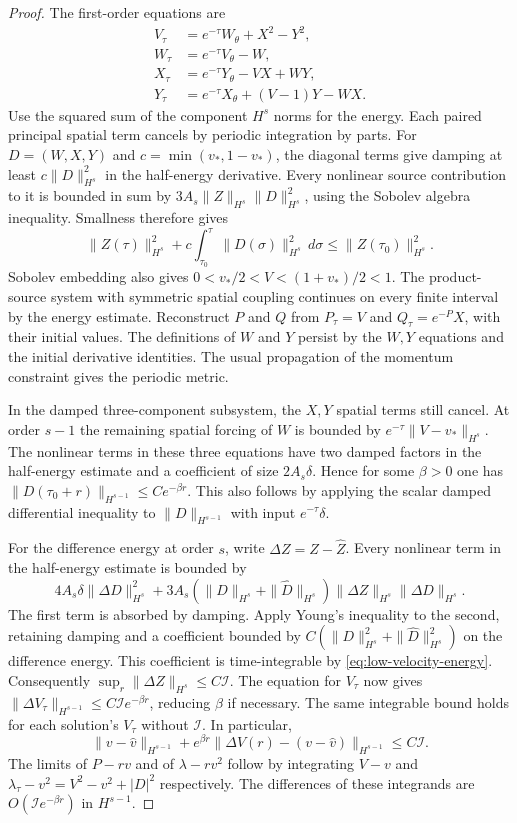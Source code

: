 \begin{proof}
The first-order equations are
\begin{align*}
 V_\tau &= e^{-\tau}W_\theta+X^2-Y^2,\\
 W_\tau &= e^{-\tau}V_\theta-W,\\
 X_\tau &= e^{-\tau}Y_\theta-V X+W Y,\\
 Y_\tau &= e^{-\tau}X_\theta+(V-1)Y-W X .
\end{align*}
Use the squared sum of the component $H^s$ norms
for the energy. Each paired principal spatial
term cancels by periodic integration by parts.
For $D=(W,X,Y)$ and $c=\min(v_*,1-v_*)$,
the diagonal terms give damping at least
$c\|D\|_{H^s}^2$ in the half-energy derivative.
Every nonlinear source contribution to it is
bounded in sum by
$3A_s\|Z\|_{H^s}\|D\|_{H^s}^2$, using the Sobolev
algebra inequality. Smallness therefore gives
\begin{equation}
 \|Z(\tau)\|_{H^s}^2+
             c\int_{\tau_0}^{\tau}\|D(\sigma)\|_{H^s}^2\,d\sigma
     \le \|Z(\tau_0)\|_{H^s}^2.
 \label{eq:low-velocity-energy}
\end{equation}
Sobolev embedding also gives
$0<v_*/2<V< (1+v_*)/2<1$.
The product-source system with symmetric
spatial coupling continues on every finite interval
by the energy estimate. Reconstruct $P$ and $Q$
from $P_\tau=V$ and $Q_\tau=e^{-P}X$,
with their initial values. The definitions of $W$
and $Y$ persist by the $W,Y$ equations and the initial
derivative identities. The usual
propagation of the momentum constraint gives
the periodic metric.

In the damped three-component subsystem,
the $X,Y$ spatial terms still cancel.
At order $s-1$ the remaining spatial forcing
of $W$ is bounded by $e^{-\tau}\|V-v_*\|_{H^s}$.
The nonlinear terms in these three equations
have two damped factors in the half-energy
estimate and a coefficient of size $2A_s\delta$.
Hence for some $\beta>0$ one has
$\|D(\tau_0+r)\|_{H^{s-1}}\le C e^{-\beta r}$.
This also follows by applying the scalar
damped differential inequality to
$\|D\|_{H^{s-1}}$ with input $e^{-\tau}\delta$.

For the difference energy at order $s$, write
$\Delta Z=Z-\widehat Z$. Every nonlinear term
in the half-energy estimate is bounded by
\[
 4A_s\delta\|\Delta D\|_{H^s}^2
  +3A_s(\|D\|_{H^s}+\|\widehat D\|_{H^s})
           \|\Delta Z\|_{H^s}\|\Delta D\|_{H^s}.
\]
The first term is absorbed by damping. Apply
Young's inequality to the second, retaining
damping and a coefficient bounded by
$C(\|D\|_{H^s}^2+\|\widehat D\|_{H^s}^2)$
on the difference energy.
This coefficient is time-integrable by
\eqref{eq:low-velocity-energy}. Consequently
$\sup_r\|\Delta Z\|_{H^s}\le C\mathcal I$.
The equation for $V_\tau$ now gives
$\|\Delta V_\tau\|_{H^{s-1}}
 \le C\mathcal I e^{-\beta r}$, reducing $\beta$
if necessary. The same integrable bound holds for
each solution's $V_\tau$ without $\mathcal I$.
In particular,
\[
 \|v-\widehat v\|_{H^{s-1}}
       +e^{\beta r}\|\Delta V(r)-(v-\widehat v)\|_{H^{s-1}}
 \le C\mathcal I .
\]
The limits of $P-rv$ and of $\lambda-rv^2$ follow
by integrating $V-v$ and
$\lambda_\tau-v^2=V^2-v^2+|D|^2$ respectively.
The differences of these integrands are
$O(\mathcal I e^{-\beta r})$ in $H^{s-1}$.


\end{proof}
